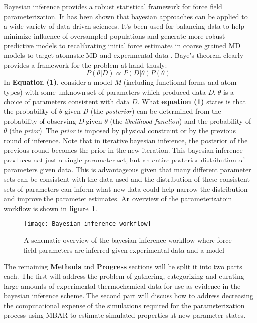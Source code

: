 \documentclass[rmp,nofootinbib,superscriptaddress,12pt,tightenlines,notitlepage]{revtex4-1}
\begin{document}
Bayesian inference provides a robust statistical framework for force field parameterization. It has been shown that 
bayesian approaches can be applied to a wide variety of data driven sciences. It's been used for balancing data to 
help minimize influence of oversampled populations and generate more robust predictive models\cite{bayes_imbalance} 
to recalibrating initial force estimates in coarse grained MD models to target atomistic MD and experimental data
\cite{bayes_coarse}. Baye's theorem clearly provides a framework for the problem at hand thusly:
\begin{equation} P\left(\theta|D\right) \propto P\left(D|\theta\right) P\left(\theta\right)\end{equation}
In \textbf{Equation (1)}, consider a model $M$ (including functional forms and atom types) with some unknown set of 
parameters which produced data $D$. $\theta$ is a choice of parameters consistent with data $D$. What \textbf{equation 
(1)} states is that the probability of $\theta$ given $D$ (the \textit{posterior}) can be determined from the probability 
of observing $D$ given $\theta$ (the \textit{likelihood function}) and the probability of $\theta$ (the \textit{prior}). The 
\textit{prior} is imposed by physical constraint or by the previous round of inference. Note that in 
iterative bayesian inference, the posterior of the previous round becomes the prior in the new iteration. This bayesian 
inference produces not just a single parameter set, but an entire posterior distribution of parameters given data. This is advantageous 
given that many different parameter sets can be consistent with the data used and the distribution of these consistent 
sets of parameters can inform what new data could help narrow the distribution and improve the parameter estimates. An overview
of the parameterizatoin workflow is shown in \textbf{figure 1}. 
 \begin{figure}[h!]
  \centering
  \texttt{[image: Bayesian\_inference\_workflow]}
  \caption{A schematic overview of the bayesian inference workflow where force field parameters are inferred given experimental data and a model}
 \end{figure}

The remaining \textbf{Methods} and \textbf{Progress} sections will be split it into two parts each. The first will address the 
problem of gathering, categorizing and curating large amounts of experimental thermochemical data for use as evidence in the 
bayesian inference scheme. The second part will discuss how to address decreasing the computational expense of the simulations
required for the parameterization process using MBAR to estimate simulated properties at new parameter states.  
\end{document}
